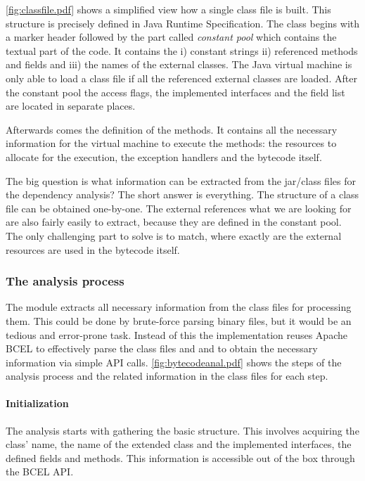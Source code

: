 \autoref{fig:classfile.pdf} shows a simplified view how a single class
file is built. This structure is precisely defined in Java Runtime
Specification. The class begins with a marker header followed by the part called
\textit{constant pool} which contains the textual part of the code. It contains
the i) constant strings ii) referenced methods and fields and iii) the names of
the external classes. The Java virtual machine is only able to load a class file
if all the referenced external classes are loaded.
After the constant pool the access flags, the implemented interfaces and the
field list are located in separate places.

Afterwards comes the definition of the methods. It contains all the necessary
information for the virtual machine to execute the methods: the resources to 
allocate for the execution, the exception handlers and the bytecode itself. 

The big question is what information can be extracted from the jar/class files
for the dependency analysis? The short answer is everything. The structure of a
class file can be obtained one-by-one. The external references what we are
looking for are also fairly easily to extract, because they are defined in the
constant pool. The only challenging part to solve is to match, where exactly are
the external resources are used in the bytecode itself.


\subsubsection{The analysis process}
The module extracts all necessary information from the class files for processing
them. This could be done by brute-force parsing binary files, but it would be an
tedious and error-prone task. Instead of this the implementation reuses Apache
BCEL to effectively parse the class files and and to obtain the necessary
information via simple API calls.
\autoref{fig:bytecodeanal.pdf} shows the steps of the analysis process and the
related information in the class files for each step. 

\paragraph{Initialization}
The analysis starts with gathering the basic structure. This involves acquiring
the class' name, the name of the extended class and the implemented interfaces,
the defined fields and methods. This information is accessible out of the box
through the BCEL API.  


